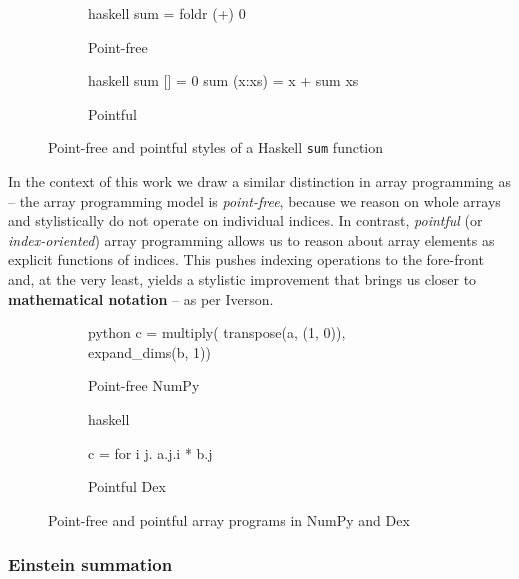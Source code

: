 \begin{figure}[h]
\centering
\begin{subfigure}{.3\textwidth}
  \centering
    \begin{cminted}{haskell}
sum = foldr (+) 0
    \end{cminted}
      \caption{Point-free}
\end{subfigure}%
\begin{subfigure}{.3\textwidth}
  \centering
  \begin{cminted}{haskell}
sum [] = 0
sum (x:xs) = x + sum xs
  \end{cminted}
  \caption{Pointful}
\end{subfigure}
\caption{Point-free and pointful styles of a Haskell \texttt{sum} function}
\label{fig:point-haskell}
\end{figure}

In the context of this work we draw a similar distinction in array programming as \textcite{paszke2021getting} -- the array programming model is \textit{point-free}, because we reason on whole arrays and stylistically do not operate on individual indices. In contrast, \textit{pointful} (or \textit{index-oriented}) array programming allows us to reason about array elements as explicit functions of indices. This pushes indexing operations to the fore-front and, at the very least, yields a stylistic improvement that brings us closer to \textbf{mathematical 
notation} -- as per Iverson.

\begin{figure}[h]
\centering
\begin{subfigure}{.4\textwidth}
  \centering
    \begin{cminted}{python}
c = multiply(
  transpose(a, (1, 0)),
  expand_dims(b, 1))
    \end{cminted}
      \caption{Point-free NumPy}
\end{subfigure}%
\begin{subfigure}{.4\textwidth}
  \centering
  \begin{cminted}{haskell}

c = for i j. a.j.i * b.j
  
  \end{cminted}
  \caption{Pointful Dex}
\end{subfigure}
\caption{Point-free and pointful array programs in NumPy and Dex}
\label{fig:point-arrays}
\end{figure}


\subsubsection{Einstein summation}

